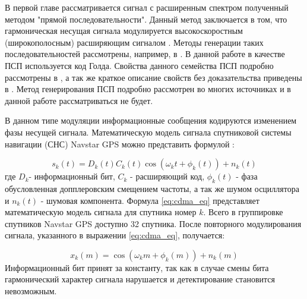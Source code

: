 В первой главе рассматривается сигнал с расширенным спектром полученный методом "прямой последовательности".
Данный метод заключается в том, что гармоническая несущая сигнала модулируется высокоскоростным (широкополосным)
расширяющим сигналом \cite{sklyar}. Методы генерации таких последовательностей рассмотрены, например, в \cite{gantmaher-book, varakin-book, pestryakov-book}.
В данной работе в качестве ПСП используется код Голда. Свойства данного семейства ПСП подробно рассмотрены в \cite{gold-ieee},
а так же краткое описание свойств без доказательства приведены в \cite{tsui, akos-book}. Метод генерирования ПСП подробно рассмотрен
во многих источниках \cite{tsui, akos-book, kaplan} и в данной работе рассматриваться не будет.

В данном типе модуляции информационные сообщения кодируются изменением фазы несущей сигнала.
Математическую модель сигнала спутниковой системы навигации (СНС) Navstar GPS можно представить формулой \cite{tsui, akos-book, kaplan}:

\begin{equation}
	\label{eq:cdma_eq}
	s_k(t)=D_k(t)C_k(t)\cos{(\omega_{k}t + \phi_k(t))} + n_k(t)
\end{equation}
где ${D_k}$- информационный бит, ${C_k}$ - расширяющий код, ${\phi_k(t)}$ - фаза обусловленная допплеровским смещением частоты, а так же шумом осциллятора
и ${n_k(t)}$ - шумовая компонента. Формула  \ref{eq:cdma_eq} представляет математическую модель сигнала для спутника номер ${k}$.
Всего в группировке спутников Navstar GPS доступно 32 спутника. После повторного модулирования сигнала, указанного в выражении \ref{eq:cdma_eq},
получается:

\begin{equation}
	\label{eq:cdma_strip_eq}
	x_k(m)=\cos{(\omega_{k}m + \phi_k(m))} + n_k(m)
\end{equation}
Информационный бит принят за константу, так как в случае смены бита гармонический характер сигнала нарушается и детектирование становится невозможным.
